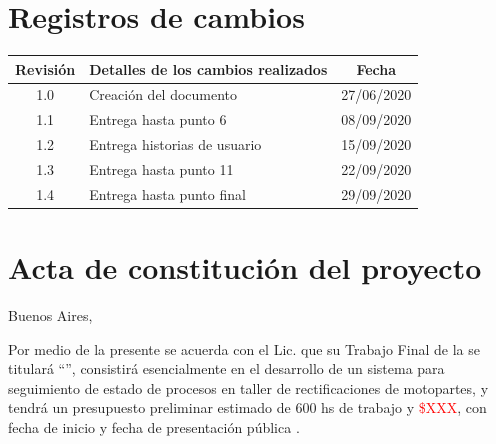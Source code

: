 \documentclass[11pt]{charter}
\begin{document}
\maketitle
\thispagestyle{empty}
\pagebreak


\thispagestyle{empty}
{\setlength{\parskip}{0pt}
\tableofcontents{}
}
\pagebreak


\section{Registros de cambios}
\label{sec:registro}


\begin{table}[ht]
\label{tab:registro}
\centering
\begin{tabularx}{\linewidth}{@{}|c|X|c|@{}}
\hline
\rowcolor[HTML]{C0C0C0} 
Revisión & \multicolumn{1}{c|}{\cellcolor[HTML]{C0C0C0}Detalles de los cambios realizados} & Fecha      \\ \hline
1.0      & Creación del documento                                          & 27/06/2020 \\ \hline
1.1      & Entrega hasta punto 6                                           & 08/09/2020 \\ \hline
1.2      & Entrega historias de usuario										& 15/09/2020    \\ \hline
1.3	     & Entrega hasta punto 11										& 22/09/2020    \\ \hline
1.4	     & Entrega hasta punto final										& 29/09/2020    \\ \hline
\end{tabularx}
\end{table}

\pagebreak



\section{Acta de constitución del proyecto}
\label{sec:acta}

\begin{flushright}
Buenos Aires, \fechaInicioName
\end{flushright}

\vspace{2cm}

Por medio de la presente se acuerda con el Lic. \authorname\hspace{1px} que su Trabajo Final de la \degreename\hspace{1px} se titulará ``\ttitle'', consistirá esencialmente en el desarrollo de un sistema para seguimiento de estado de procesos en taller de rectificaciones de motopartes, y tendrá un presupuesto preliminar estimado de 600 hs de trabajo y \textcolor{red}{\$XXX}, con fecha de inicio \fechaInicioName\hspace{1px} y fecha de presentación pública \fechaFinalName.
\end{document}
